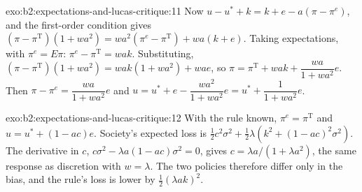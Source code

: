 \begin{solution}{exo:b2:expectations-and-lucas-critique:11}
Now $u - u^* + k = k + e - a(\pi - \pi^e)$, and the first-order condition gives $(\pi - \pi^{\mathrm T})(1 + wa^2) = wa^2(\pi^e - \pi^{\mathrm T}) + wa(k + e)$. Taking expectations, with $\pi^e = E\pi$: $\pi^e - \pi^{\mathrm T} = wak$. Substituting,
$(\pi - \pi^{\mathrm T})(1 + wa^2) = wak(1 + wa^2) + wae$, so $\pi = \pi^{\mathrm T} + wak + \dfrac{wa}{1 + wa^2}e$. Then $\pi - \pi^e = \dfrac{wa}{1 + wa^2}e$ and $u = u^* + e - \dfrac{wa^2}{1 + wa^2}e = u^* + \dfrac{1}{1 + wa^2}e$.
\end{solution}

\begin{solution}{exo:b2:expectations-and-lucas-critique:12}
With the rule known, $\pi^e = \pi^{\mathrm T}$ and $u = u^* + (1 - ac)e$. Society's expected loss is $\tfrac12c^2\sigma^2 + \tfrac12\lambda(k^2 + (1 - ac)^2\sigma^2)$. The derivative in $c$, $c\sigma^2 - \lambda a(1 - ac)\sigma^2 = 0$, gives $c = \lambda a/(1 + \lambda a^2)$, the
same response as discretion with $w = \lambda$. The two policies therefore differ only in the bias, and the rule's loss is lower by $\tfrac12(\lambda ak)^2$.
\end{solution}


